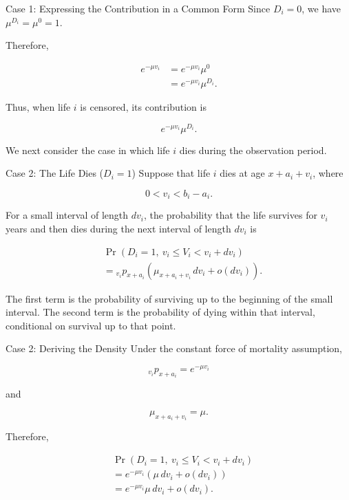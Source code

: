 \documentclass[
  ignorenonframetext,
  aspectratio=169,
]{beamer}
\begin{document}
\begin{frame}{Case 1: Expressing the Contribution in a Common Form}
\protect{}\label{case-1-expressing-the-contribution-in-a-common-form}
Since \(D_i=0\), we have \(\mu^{D_i}=\mu^0=1\).

Therefore,

\[
\begin{aligned}
e^{-\mu v_i}
&=e^{-\mu v_i}\mu^0\\
&=e^{-\mu v_i}\mu^{D_i}.
\end{aligned}
\]

Thus, when life \(i\) is censored, its contribution is

\[
\boxed{e^{-\mu v_i}\mu^{D_i}}.
\]

We next consider the case in which life \(i\) dies during the
observation period.
\end{frame}

\begin{frame}{Case 2: The Life Dies (\(D_i=1\))}
\protect{}\label{case-2-the-life-dies-d_i1}
Suppose that life \(i\) dies at age \(x+a_i+v_i\), where

\[
0<v_i<b_i-a_i.
\]

For a small interval of length \(dv_i\), the probability that the life
survives for \(v_i\) years and then dies during the next interval of
length \(dv_i\) is

\[
\begin{aligned}
&\Pr(D_i=1,\ v_i\leq V_i<v_i+dv_i)\\
&={}_{v_i}p_{x+a_i}
\left(
\mu_{x+a_i+v_i}\,dv_i+o(dv_i)
\right).
\end{aligned}
\]

The first term is the probability of surviving up to the beginning of
the small interval. The second term is the probability of dying within
that interval, conditional on survival up to that point.
\end{frame}

\begin{frame}{Case 2: Deriving the Density}
\protect{}\label{case-2-deriving-the-density}
Under the constant force of mortality assumption,

\[
{}_{v_i}p_{x+a_i}=e^{-\mu v_i}
\]

and

\[
\mu_{x+a_i+v_i}=\mu.
\]

Therefore,

\[
\begin{aligned}
&\Pr(D_i=1,\ v_i\leq V_i<v_i+dv_i)\\
&=e^{-\mu v_i}
\left(\mu\,dv_i+o(dv_i)\right)\\
&=e^{-\mu v_i}\mu\,dv_i+o(dv_i).
\end{aligned}
\]
\end{frame}
\end{document}

